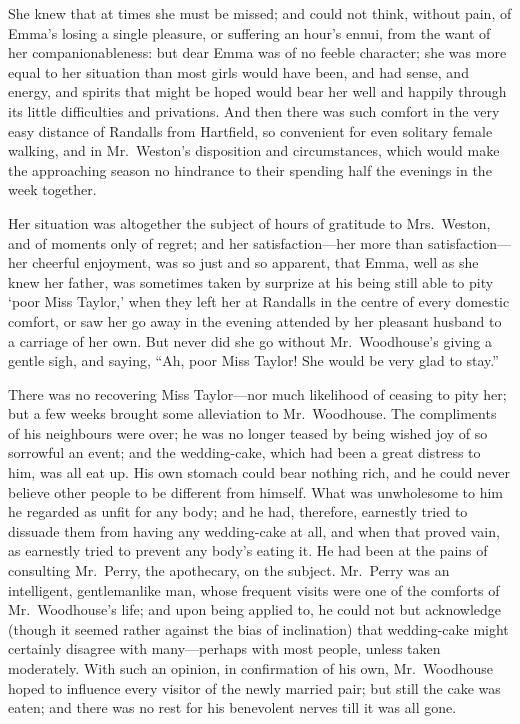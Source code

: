 She knew that at times she must be missed; and could not think,
without pain, of Emma's losing a single pleasure, or suffering
an hour's ennui, from the want of her companionableness: but dear
Emma was of no feeble character; she was more equal to her situation
than most girls would have been, and had sense, and energy,
and spirits that might be hoped would bear her well and happily
through its little difficulties and privations.  And then there was
such comfort in the very easy distance of Randalls from Hartfield,
so convenient for even solitary female walking, and in Mr.\ Weston's
disposition and circumstances, which would make the approaching
season no hindrance to their spending half the evenings in the
week together.

Her situation was altogether the subject of hours of gratitude
to Mrs.\ Weston, and of moments only of regret; and her
satisfaction---her more than satisfaction---her cheerful enjoyment,
was so just and so apparent, that Emma, well as she knew her father,
was sometimes taken by surprize at his being still able to pity
`poor Miss Taylor,' when they left her at Randalls in the centre
of every domestic comfort, or saw her go away in the evening
attended by her pleasant husband to a carriage of her own.
But never did she go without Mr.\ Woodhouse's giving a gentle sigh,
and saying, ``Ah, poor Miss Taylor! She would be very glad to stay.''

There was no recovering Miss Taylor---nor much likelihood of
ceasing to pity her; but a few weeks brought some alleviation
to Mr.\ Woodhouse.  The compliments of his neighbours were over;
he was no longer teased by being wished joy of so sorrowful an event;
and the wedding-cake, which had been a great distress to him,
was all eat up.  His own stomach could bear nothing rich, and he
could never believe other people to be different from himself.
What was unwholesome to him he regarded as unfit for any body;
and he had, therefore, earnestly tried to dissuade them from having
any wedding-cake at all, and when that proved vain, as earnestly
tried to prevent any body's eating it.  He had been at the pains
of consulting Mr.\ Perry, the apothecary, on the subject.  Mr.\ Perry
was an intelligent, gentlemanlike man, whose frequent visits were one
of the comforts of Mr.\ Woodhouse's life; and upon being applied to,
he could not but acknowledge (though it seemed rather against the
bias of inclination) that wedding-cake might certainly disagree
with many---perhaps with most people, unless taken moderately.
With such an opinion, in confirmation of his own, Mr.\ Woodhouse hoped
to influence every visitor of the newly married pair; but still the
cake was eaten; and there was no rest for his benevolent nerves till
it was all gone.

